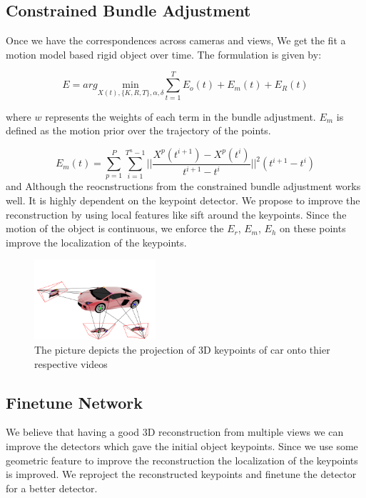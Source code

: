 \documentclass[10pt,twocolumn,letterpaper]{article}
\begin{document}
\subsection{Constrained Bundle Adjustment}

Once we have the correspondences across cameras and views, We get the fit a motion model based rigid object over time. The formulation is given by:

\begin{equation}
 E = arg \underset{X(t),\{K,R,T\},\alpha,\delta} {\mathrm{min}} \sum_{t=1}^T E_o(t) +  E_m(t) + E_R(t)
 \label{eq:STBA}
\end{equation}

where $w$ represents the weights of each term in the bundle adjustment. $E_m$ is defined as the motion prior over the trajectory of the points.

\begin{equation}
E_m(t) = \sum_{p =1 }^P \sum_{i = 1}^{T^n -1} ||\frac{X^p(t^{i+1}) - X^p(t^{i})}{t^{i+1} - t^{i}}||^2 (t^{i+1} - t^{i})
\end{equation}
and 
Although the reocnstructions from the constrained bundle adjustment works well. It is highly dependent on the keypoint detector. We propose to improve the reconstruction by using local features like sift around the keypoints. Since the motion of the object is continuous, we enforce the $E_r$, $E_m$, $E_h$ on these points improve the localization of the keypoints.
\begin{figure}
  \centering
    \includegraphics[width=0.4\textwidth]{images/corr}
  \caption{The picture depicts the projection of 3D keypoints of car onto thier respective videos}
  \label{fig:corr}
\end{figure}

\subsection{Finetune Network}
 \label{ref:retrain}
 We believe that having a good 3D reconstruction from multiple views we can improve the detectors which gave the initial object keypoints. Since we use some geometric feature to improve the reconstruction the localization of the keypoints is improved. We reproject the reconstructed keypoints and finetune the detector for a better detector.
\end{document}
